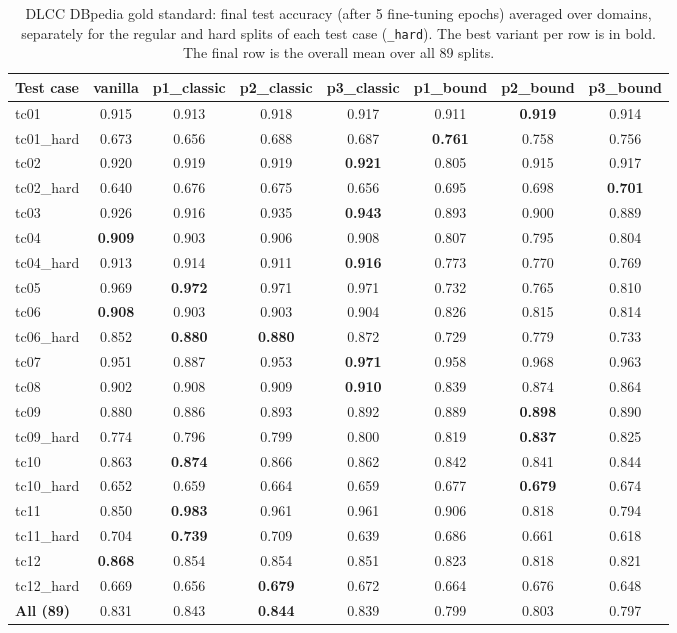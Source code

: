 \documentclass[a4paper,oneside,bibliography=totoc]{scrbook}
\begin{document}
\begin{table}[t]
\centering
\small
\caption{DLCC DBpedia gold standard: final test accuracy (after 5 fine-tuning
epochs) averaged over domains, separately for the regular and hard splits of
each test case (\texttt{\_hard}). The best variant per row is in bold. The final
row is the overall mean over all 89 splits.}
\label{tab:dbpedia_per_tc}
\footnotesize
\setlength{\tabcolsep}{3.5pt}
\begin{tabular}{lccccccc}
\toprule
\textbf{Test case} & \textbf{vanilla} & \textbf{p1\_classic}
& \textbf{p2\_classic} & \textbf{p3\_classic} & \textbf{p1\_bound}
& \textbf{p2\_bound} & \textbf{p3\_bound} \\
\midrule
tc01 & 0.915 & 0.913 & 0.918 & 0.917 & 0.911 & \textbf{0.919} & 0.914 \\
tc01\_hard & 0.673 & 0.656 & 0.688 & 0.687 & \textbf{0.761} & 0.758 & 0.756 \\
tc02 & 0.920 & 0.919 & 0.919 & \textbf{0.921} & 0.805 & 0.915 & 0.917 \\
tc02\_hard & 0.640 & 0.676 & 0.675 & 0.656 & 0.695 & 0.698 & \textbf{0.701} \\
tc03 & 0.926 & 0.916 & 0.935 & \textbf{0.943} & 0.893 & 0.900 & 0.889 \\
tc04 & \textbf{0.909} & 0.903 & 0.906 & 0.908 & 0.807 & 0.795 & 0.804 \\
tc04\_hard & 0.913 & 0.914 & 0.911 & \textbf{0.916} & 0.773 & 0.770 & 0.769 \\
tc05 & 0.969 & \textbf{0.972} & 0.971 & 0.971 & 0.732 & 0.765 & 0.810 \\
tc06 & \textbf{0.908} & 0.903 & 0.903 & 0.904 & 0.826 & 0.815 & 0.814 \\
tc06\_hard & 0.852 & \textbf{0.880} & \textbf{0.880} & 0.872 & 0.729 & 0.779 & 0.733 \\
tc07 & 0.951 & 0.887 & 0.953 & \textbf{0.971} & 0.958 & 0.968 & 0.963 \\
tc08 & 0.902 & 0.908 & 0.909 & \textbf{0.910} & 0.839 & 0.874 & 0.864 \\
tc09 & 0.880 & 0.886 & 0.893 & 0.892 & 0.889 & \textbf{0.898} & 0.890 \\
tc09\_hard & 0.774 & 0.796 & 0.799 & 0.800 & 0.819 & \textbf{0.837} & 0.825 \\
tc10 & 0.863 & \textbf{0.874} & 0.866 & 0.862 & 0.842 & 0.841 & 0.844 \\
tc10\_hard & 0.652 & 0.659 & 0.664 & 0.659 & 0.677 & \textbf{0.679} & 0.674 \\
tc11 & 0.850 & \textbf{0.983} & 0.961 & 0.961 & 0.906 & 0.818 & 0.794 \\
tc11\_hard & 0.704 & \textbf{0.739} & 0.709 & 0.639 & 0.686 & 0.661 & 0.618 \\
tc12 & \textbf{0.868} & 0.854 & 0.854 & 0.851 & 0.823 & 0.818 & 0.821 \\
tc12\_hard & 0.669 & 0.656 & \textbf{0.679} & 0.672 & 0.664 & 0.676 & 0.648 \\
\midrule
\textbf{All (89)} & 0.831 & 0.843 & \textbf{0.844} & 0.839 & 0.799 & 0.803 & 0.797 \\
\bottomrule
\end{tabular}
\end{table}
\end{document}

